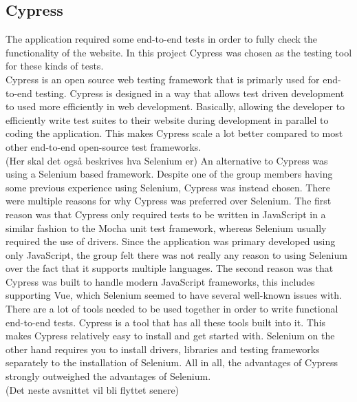 \subsection{Cypress}
The application required some end-to-end tests in order to fully check the functionality of the website. In this project Cypress was chosen as the testing tool for these kinds of tests.
\\[11pt]
Cypress is an open source web testing framework that is primarly used for end-to-end testing. Cypress is designed in a way that allows test driven development to used more efficiently in web development. Basically, allowing the developer to efficiently write test suites to their website during development in parallel to coding the application. This makes Cypress scale a lot better compared to most other end-to-end open-source test frameworks.
\\[11pt]
(Her skal det også beskrives hva Selenium er)
An alternative to Cypress was using a Selenium based framework. Despite one of the group members having some previous experience using Selenium, Cypress was instead chosen. There were multiple reasons for why Cypress was preferred over Selenium. The first reason was that Cypress only required tests to be written in JavaScript in a similar fashion to the Mocha unit test framework, whereas Selenium usually required the use of drivers. Since the application was primary developed using only JavaScript, the group felt there was not really any reason to using Selenium over the fact that it supports multiple languages. The second reason was that Cypress was built to handle modern JavaScript frameworks, this includes supporting Vue, which Selenium seemed to have several well-known issues with. There are a lot of tools needed to be used together in order to write functional end-to-end tests. Cypress is a tool that has all these tools built into it. This makes Cypress relatively easy to install and get started with. Selenium on the other hand requires you to install drivers, libraries and testing frameworks separately to the installation of Selenium. All in all, the advantages of Cypress strongly outweighed the advantages of Selenium.
\\[11pt]
(Det neste avsnittet vil bli flyttet senere)
